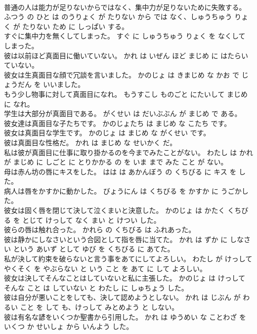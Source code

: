 \documentclass[8pt]{extreport}
\begin{document}
\begin{CJK}{UTF8}{min}
\\	普通の人は能力が足りないからではなく、集中力が足りないために失敗する。	ふつう の ひと は のうりょく が たりない から では なく、しゅうちゅう りょく が たりない ため に しっぱい する。	
\\	すぐに集中力を無くしてしまった。	すぐ に しゅうちゅう りょく を なくして しまった。	
\\	彼は以前ほど真面目に働いていない。	かれ は いぜん ほど まじめ に はたらいていない。	
\\	彼女は生真面目な顔で冗談を言いました。	かのじょ は きまじめ な かお で じょうだん を いいました。	
\\	もう少し物事に対して真面目になれ。	もうすこし ものごと にたいして まじめ に なれ。	
\\	学生は大部分が真面目である。	がくせい は だいぶぶん が まじめ で ある。	
\\	彼女達は真面目な子たちです。	かのじょたち は まじめ な こたち です。	
\\	彼女は真面目な学生です。	かのじょ は まじめ な がくせい です。	
\\	彼は真面目な性格だ。	かれ は まじめ な せいかく だ。	
\\	私は彼が真面目に仕事に取り掛かるのを今までみたことがない。	わたし は かれ が まじめ に しごと に とりかかる の を いま まで みた こと が ない。	
\\	母は赤ん坊の唇にキスをした。	はは は あかんぼう の くちびる に キス を した。	
\\	病人は唇をかすかに動かした。	びょうにん は くちびる を かすか に うごかした。	
\\	彼女は固く唇を閉じて決して泣くまいと決意した。	かのじょ は かたく くちびる を とじて けっして なく まい と けつい した。	
\\	彼らの唇は触れ合った。	かれら の くちびる は ふれあった。	
\\	彼は静かにしなさいという合図として指を唇に当てた。	かれ は ずか に しなさい という あいず として ゆび を くちびる に あてた。	
\\	私が決して約束を破らないと言う事をあてにしてよろしい。	わたし が けっして やくそく を やぶらない と いう こと を あて に して よろしい。	
\\	彼女は決してそんなことはしていないと私に主張した。	かのじょ は けっして そんな こと は していない と わたし に しゅちょう した。	
\\	彼は自分が悪いことをしても、決して認めようとしない。	かれ は じぶん が わるい こと を して も、けっして みとめよう と しない。	
\\	彼は有名な諺をいくつか聖書から引用した。	かれ は ゆうめい な ことわざ を いくつ か せいしょ から いんよう した。	

\end{CJK}
\end{document}
